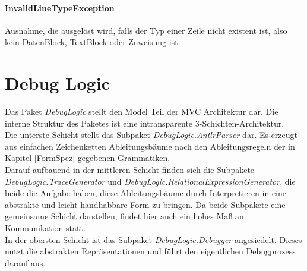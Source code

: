 \documentclass[parskip=full]{scrartcl}
\begin{document}
\paragraph{InvalidLineTypeException}
Ausnahme, die ausgelöst wird, falls der Typ einer Zeile nicht existent ist, also kein DatenBlock, TextBlock oder Zuweisung ist.


\section{Debug Logic}
Das Paket \textit{DebugLogic} stellt den Model Teil der MVC Architektur dar. Die interne Struktur des Paketes ist eine intransparente 3-Schichten-Architektur.\\
Die unterste Schicht stellt das Subpaket \textit{DebugLogic.AntlrParser} dar. Es erzeugt aus einfachen Zeichenketten Ableitungsbäume nach den Ableitungsregeln der in Kapitel \ref{FormSpez} gegebenen Grammatiken.\\ Darauf aufbauend in der mittleren Schicht finden sich die Subpakete \textit{DebugLogic.TraceGenerator} und \textit{DebugLogic.RelationalExpressionGenerator}, die beide die Aufgabe haben, diese Ableitungsbäume durch Interpretieren in eine abstrakte und leicht handhabbare Form zu bringen. Da beide Subpakete eine gemeinsame Schicht darstellen, findet hier auch ein hohes Maß an Kommunikation statt. \\ In der obersten Schicht ist das Subpaket \textit{DebugLogic.Debugger} angesiedelt. Dieses nutzt die abstrakten Repräsentationen und führt den eigentlichen Debugprozess darauf aus.
\end{document}
